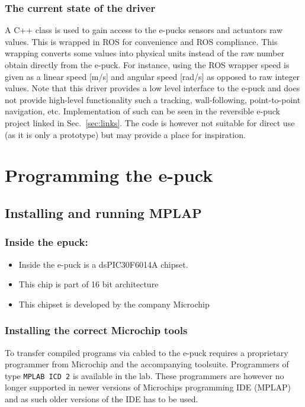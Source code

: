 \documentclass{article}
\newcommand{\stt}[1]{{\small\tt #1}}
\begin{document}
\subsubsection*{The current state of the driver}
A C++ class is used to gain access to the e-pucks sensors and actuators raw values. This is wrapped in ROS for convenience and ROS compliance. This wrapping converts some values into physical units instead of the raw number obtain directly from the e-puck. For instance, using the ROS wrapper speed is given as a linear speed [m/s] and angular speed [rad/s] as opposed to raw integer values. Note that this driver provides a low level interface to the e-puck and does not provide high-level functionality such a tracking, wall-following, point-to-point navigation, etc. Implementation of such can be seen in the reversible e-puck project linked in Sec.~\ref{sec:links}. The code is however not suitable for direct use (as it is only a prototype) but may provide a place for inspiration.  





\newpage
\section{Programming the e-puck}
\subsection{Installing and running MPLAP}

\subsubsection*{Inside the epuck:}
\begin{itemize}
\item Inside the e-puck is a dsPIC30F6014A chipset.
\item This chip is part of 16 bit architecture
\item This chipset is developed by the company Microchip
\end{itemize}

\subsubsection*{Installing the correct Microchip tools}
To transfer compiled programs via cabled to the e-puck requires a proprietary programmer from Microchip and the accompanying toolsuite.
Programmers of type \stt{MPLAB ICD 2} is available in the lab. These programmers are however no longer supported
in newer versions of Microchips programming IDE (MPLAP) and as such older versions of the IDE has to be used. 
\end{document}
